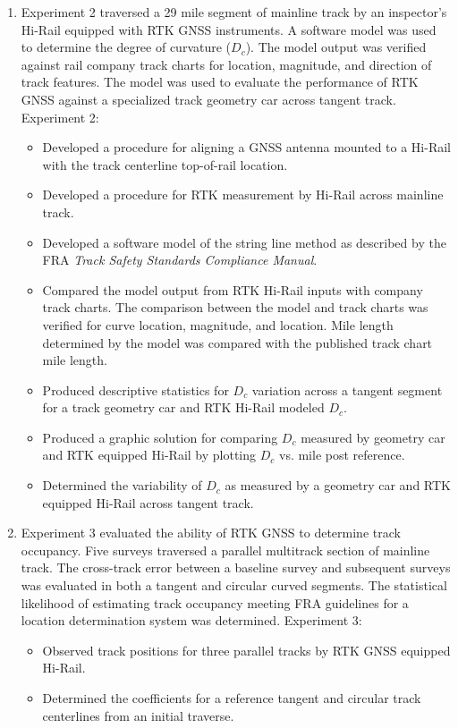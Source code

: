 \begin{enumerate}
\item Experiment 2 traversed a 29 mile segment of mainline track by an inspector's Hi-Rail equipped with RTK GNSS instruments. A software model was used to determine the degree of curvature (${D_c}$). The model output was verified against rail company track charts for location, magnitude, and direction of track features. The model was used to evaluate the performance of RTK GNSS against a specialized track geometry car across tangent track. Experiment 2:
\begin{itemize}
	\item Developed a procedure for aligning a GNSS antenna mounted to a Hi-Rail with the track centerline top-of-rail location.
	\item Developed a procedure for RTK measurement by Hi-Rail across mainline track.
	\item Developed a software model of the string line method as described by the FRA \emph{Track Safety Standards Compliance Manual}.~\citep{2007FRATrack}
	\item Compared the model output from RTK Hi-Rail inputs with company track charts. The comparison between the model and track charts was verified for curve location, magnitude, and location. Mile length determined by the model was compared with the published track chart mile length.
	\item Produced descriptive statistics for $D_c$ variation across a tangent segment for a track geometry car and RTK Hi-Rail modeled $D_c$.
	\item Produced a graphic solution for comparing $D_c$ measured by geometry car and RTK equipped Hi-Rail by plotting $D_c$ vs. mile post reference.
	\item Determined the variability of $D_c$ as measured by a geometry car and RTK equipped Hi-Rail across tangent track.
\end{itemize}

\item Experiment 3 evaluated the ability of RTK GNSS to determine track occupancy. Five surveys traversed a parallel multitrack section of mainline track. The cross-track error between a baseline survey and subsequent surveys was evaluated in both a tangent and circular curved segments. The statistical likelihood of estimating track occupancy meeting FRA guidelines for a location determination system was determined. Experiment 3:

\begin{itemize}
\item Observed track positions for three parallel tracks by RTK GNSS equipped Hi-Rail.
\item Determined the coefficients for a reference tangent and circular track centerlines from an initial traverse.


\end{itemize}
\end{enumerate}
